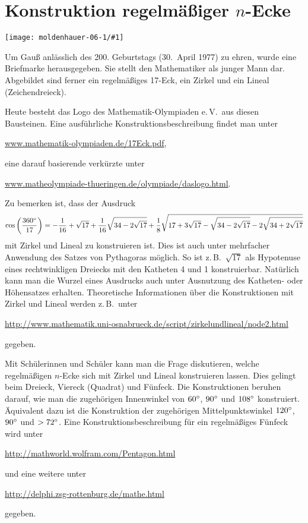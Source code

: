 \documentclass[10pt]{article}
\newcommand{\Bild}[2]{
  \begin{center}
    \texttt{[image: moldenhauer-06-1/\#1]}
  \end{center}
}
\begin{document}
\section{Konstruktion regelmäßiger $n$-Ecke}

\begin{minipage}{.3\textwidth}
  \Bild{gauss3.jpg}{1.0}
\end{minipage}\hfill
\begin{minipage}{.65\textwidth}
Um Gauß anlässlich des 200. Geburtstags (30.~April 1977) zu ehren, wurde eine
Briefmarke{\footnotemark} herausgegeben. Sie stellt den Mathematiker als
junger Mann dar. Abgebildet sind ferner ein regelmäßiges 17-Eck, ein Zirkel
und ein Lineal (Zeichendreieck).
\end{minipage}
\bigskip

Heute besteht das Logo des Mathematik-Olympiaden e.\,V.\ aus diesen
Bausteinen.  Eine aus\-führliche Konstruktionsbeschreibung findet man unter
\begin{center}
  \url{www.mathematik-olympiaden.de/17Eck.pdf},
\end{center}
eine darauf basierende verkürzte unter
\begin{center}
  \url{www.matheolympiade-thueringen.de/olympiade/daslogo.html}.
\end{center}

Zu bemerken ist, dass der Ausdruck 
\[\cos\left(\frac{360^{\circ}}{17}\right) = -\frac{1}{16}+\sqrt{17} +
\frac{1}{16}\sqrt{34-2\sqrt{17}} +\frac18 \sqrt{17+3\sqrt{17}
  -\sqrt{34-2\sqrt{17}} -2\sqrt{34+2\sqrt{17}}}
\] 
mit Zirkel und Lineal zu konstruieren ist. Dies ist auch unter mehrfacher
Anwendung des Satzes von Pythagoras möglich. So ist z.\,B.\ $\sqrt{17}$ als
Hypotenuse eines rechtwinkligen Dreiecks mit den Katheten 4 und 1
konstruierbar. Natürlich kann man die Wurzel eines Ausdrucks auch unter
Ausnutzung des Katheten- oder Höhensatzes erhalten. Theoretische Informationen
über die Konstruktionen mit Zirkel und Lineal werden z.\,B.\ unter
\begin{center}
  \url{http://www.mathematik.uni-osnabrueck.de/script/zirkelundlineal/node2.html}
\end{center}
gegeben.

Mit Schülerinnen und Schüler kann man die Frage diskutieren, welche
regelmäßigen $n$-Ecke sich mit Zirkel und Lineal konstruieren lassen. Dies
gelingt beim Dreieck, Viereck (Quadrat) und Fünfeck. Die Konstruktionen
beruhen darauf, wie man die zugehörigen Innenwinkel von $60^{\circ}$, $90^{\circ}$
und $108^{\circ}$ konstruiert. Äquivalent dazu ist die Konstruktion der
zugehörigen Mittelpunktswinkel $120^{\circ}$, $90^{\circ}$ und $>72^{\circ}$. Eine
Konstruktionsbeschreibung für ein regelmäßiges Fünfeck wird unter
\begin{center}
  \url{http://mathworld.wolfram.com/Pentagon.html}
\end{center}
und eine weitere unter
\begin{center}
  \url{http://delphi.zsg-rottenburg.de/mathe.html}
\end{center}
gegeben.
\end{document}
